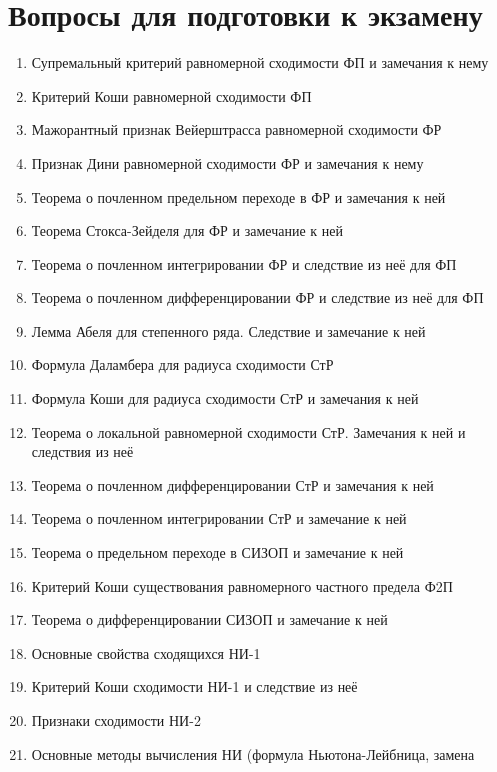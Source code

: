 \documentclass[../main.tex]{subfiles}
\begin{document}
 \chapter*{Вопросы для подготовки к экзамену}
 
 \begin{enumerate}
    \item Супремальный критерий равномерной сходимости ФП и замечания к нему
    \item Критерий Коши равномерной сходимости ФП
    \item Мажорантный признак Вейерштрасса равномерной сходимости ФР
    \item Признак Дини равномерной сходимости ФР и замечания к нему
    \item Теорема о почленном предельном переходе в ФР и замечания к ней
    \item Теорема Стокса-Зейделя для ФР и замечание к ней
    \item Теорема о почленном интегрировании ФР и следствие из неё для ФП
    \item Теорема о почленном дифференцировании ФР и следствие из неё для ФП
    \item Лемма Абеля для степенного ряда. Следствие и замечание к ней
    \item Формула Даламбера для радиуса сходимости СтР
    \item Формула Коши для радиуса сходимости СтР и замечания к ней
    \item Теорема о локальной равномерной сходимости СтР. Замечания к ней и 
    следствия из неё
    \item Теорема о почленном дифференцировании СтР и замечания к ней
    \item Теорема о почленном интегрировании СтР и замечание к ней
    \item Теорема о предельном переходе в СИЗОП и замечание к ней
    \item Критерий Коши существования равномерного частного предела Ф2П
    \item Теорема о дифференцировании СИЗОП и замечание к ней
    \item Основные свойства сходящихся НИ-1
    \item Критерий Коши сходимости НИ-1 и следствие из неё
    \item Признаки сходимости НИ-2
    \item Основные методы вычисления НИ (формула Ньютона-Лейбница, замена 

\end{enumerate}
\end{document}
